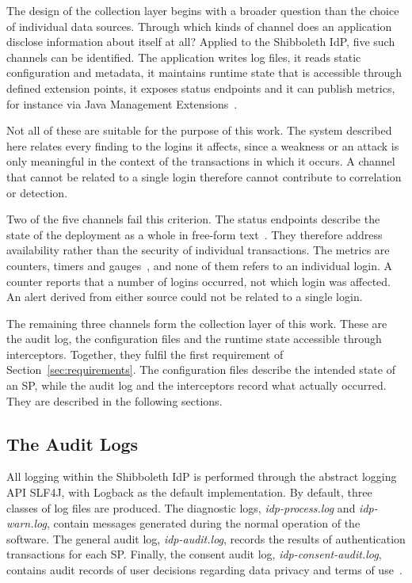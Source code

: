 \documentclass[../main.tex]{subfiles}
\begin{document}
The design of the collection layer begins with a broader question than the choice of individual data sources. 
Through which kinds of channel does an application disclose information about itself at all?
Applied to the Shibboleth IdP, five such channels can be identified. 
The application writes log files, it reads static configuration and metadata, it maintains runtime state that 
is accessible through defined extension points, it exposes status endpoints and it can publish metrics, for 
instance via Java Management Extensions~\cite{MetricsConfiguration}. 

Not all of these are suitable for the purpose of this work. 
The system described here relates every finding to the logins it affects, since a weakness or an 
attack is only meaningful in the context of the transactions in which it occurs. 
A channel that cannot be related to a single login therefore cannot contribute to correlation or detection. 

Two of the five channels fail this criterion. 
The status endpoints describe the state of the deployment as a whole in free-form text~\cite{IdPStatus}. 
They therefore address availability rather than the security of individual transactions. 
The metrics are counters, timers and gauges~\cite{MetricsConfiguration}, and none of them refers 
to an individual login. 
A counter reports that a number of logins occurred, not which login was affected. 
An alert derived from either source could not be related to a single login. 

The remaining three channels form the collection layer of this work. 
These are the audit log, the configuration files and the runtime state accessible through interceptors. 
Together, they fulfil the first requirement of Section~\ref{sec:requirements}. 
The configuration files describe the intended state of an SP, while the audit log and the 
interceptors record what actually occurred.
They are described in the following sections. 

\subsection{The Audit Logs}\label{subsec:audit-log}

All logging within the Shibboleth IdP is performed through the abstract logging API SLF4J, 
with Logback as the default implementation. 
By default, three classes of log files are produced. 
The diagnostic logs, \textit{idp-process.log} and \textit{idp-warn.log}, contain messages generated during 
the normal operation of the software. 
The general audit log, \textit{idp-audit.log}, records the results of authentication transactions for each SP. 
Finally, the consent audit log, \textit{idp-consent-audit.log}, contains audit records of user decisions 
regarding data privacy and terms of use~\cite{LoggingConfiguration}.
\end{document}
